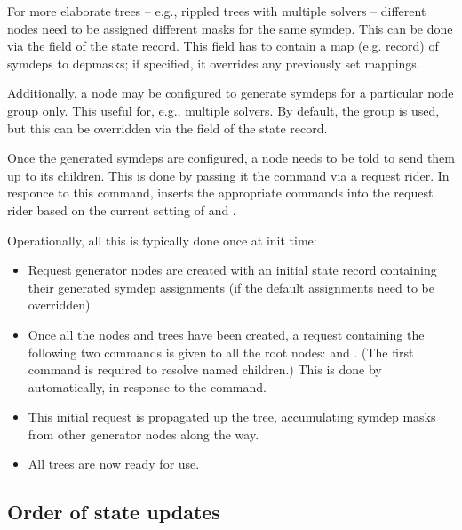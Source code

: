   For more elaborate trees -- e.g., rippled trees with multiple solvers --
  different  nodes need to be assigned different masks for the same
  symdep. This can be done via the  field of the state record.
  This field has to contain a map (e.g. record) of symdeps to depmasks; if
  specified, it overrides any previously set mappings. 

  Additionally, a node may be configured to generate symdeps for a particular
  node group only. This useful for, e.g., multiple solvers. By default, the
   group is used, but this can be overridden via the
   field of the state record.

  Once the generated symdeps are configured, a node needs to be told to send
  them up to its children. This is done by passing it the 
  command via a request rider. In responce to this command,
   inserts the appropriate  commands
  into the request rider based on the current setting of  and
  .

  Operationally, all this is typically done once at init time:
  
  \begin{itemize}
  
  \item Request generator nodes are created with an initial state record
    containing their generated symdep assignments (if the default assignments
    need to be overridden).
    
  \item Once all the nodes and trees have been created, a request containing
    the following two commands is given to all the root nodes:
     and . (The first command is
    required to resolve named children.) This is done by 
    automatically, in response to the  command.

  \item This initial request is propagated up the tree, accumulating
    symdep masks from other generator nodes along the way. 
    
  \item All trees are now ready for use.
  
  \end{itemize}

\subsection{Order of state updates}

